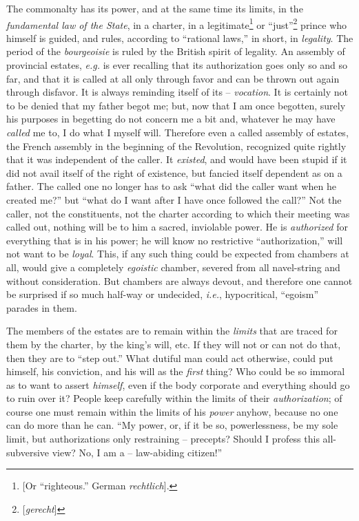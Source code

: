 The commonalty has its power, and at the same time its limits, in the 
\textit{fundamental law of the State}, in a charter, in a 
legitimate\footnote{[Or ``righteous.'' German \textit{rechtlich}].} or 
``just''\footnote{[\textit{gerecht}]} prince who himself is guided, and 
rules, according to ``rational laws,'' in short, in \textit{legality}. The 
period of the \textit{bourgeoisie} is ruled by the British spirit of legality. 
An assembly of provincial estates, \textit{e.g.} is ever recalling that its 
authorization goes only so and so far, and that it is called at all only 
through favor and can be thrown out again through disfavor. It is always 
reminding itself of its -- \textit{vocation}. It is certainly not to be denied 
that my father begot me; but, now that I am once begotten, surely his purposes 
in begetting do not concern me a bit and, whatever he may have \textit{called} 
me to, I do what I myself will. Therefore even a called assembly of estates, 
the French assembly in the beginning of the Revolution, recognized quite 
rightly that it was independent of the caller. It \textit{existed}, and would 
have been stupid if it did not avail itself of the right of existence, but 
fancied itself dependent as on a father. The called one no longer has to ask 
``what did the caller want when he created me?'' but ``what do I want after 
I have once followed the call?'' Not the caller, not the constituents, not 
the charter according to which their meeting was called out, nothing will be 
to him a sacred, inviolable power. He is \textit{authorized} for everything 
that is in his power; he will know no restrictive ``authorization,'' will 
not want to be \textit{loyal}. This, if any such thing could be expected from 
chambers at all, would give a completely \textit{egoistic} chamber, severed 
from all navel-string and without consideration. But chambers are always 
devout, and therefore one cannot be surprised if so much half-way or 
undecided, \textit{i.e.}, hypocritical, ``egoism'' parades in them.

The members of the estates are to remain within the \textit{limits} that are 
traced for them by the charter, by the king's will, etc. If they will not or 
can not do that, then they are to ``step out.'' What dutiful man could act 
otherwise, could put himself, his conviction, and his will as the 
\textit{first} thing? Who could be so immoral as to want to assert 
\textit{himself}, even if the body corporate and everything should go to ruin 
over it? People keep carefully within the limits of their 
\textit{authorization}; of course one must remain within the limits of his 
\textit{power} anyhow, because no one can do more than he can. ``My power, 
or, if it be so, powerlessness, be my sole limit, but authorizations only 
restraining -- precepts? Should I profess this all-subversive view? No, I am a 
-- law-abiding citizen!''

